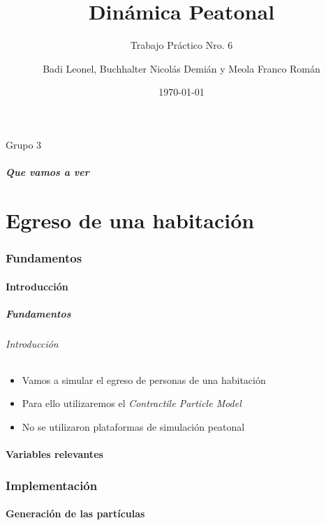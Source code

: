 \documentclass[hyperref={pdfpagelayout=SinglePage}]{beamer}
\title{Dinámica Peatonal}
\subtitle{Trabajo Práctico Nro. 6}
\author{Badi Leonel, Buchhalter Nicolás Demián y Meola Franco Román}
\date{\today}
\makeatletter
\newcommand{\parttableofcontents}{\@starttoc{parttoc}}
\makeatother
\begin{document}
\begin{frame}[plain]
    \frametitle{} 
    \titlepage
    \centering
	Grupo 3
\end{frame}

\begin{frame}
\frametitle{Que vamos a ver}
\parttableofcontents
\end{frame}

\part{Egreso de una habitación}

\section{Fundamentos}

\subsection{Introducción}

\begin{frame}
\frametitle{Fundamentos}
\framesubtitle{Introducción}
\begin{itemize}
	\item Vamos a simular el egreso de personas de una habitación
	\item Para ello utilizaremos el \textit{Contractile Particle Model} 
	\item No se utilizaron plataformas de simulación peatonal 
\end{itemize}
\end{frame}

\subsection{Variables relevantes}

\section{Implementación}

\subsection{Generación de las partículas}
\end{document}
